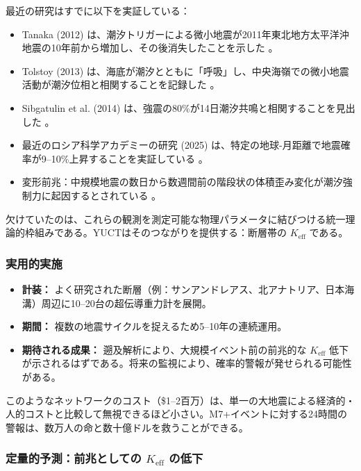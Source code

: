 \documentclass[12pt,a4paper]{article}
\theoremstyle{remark}
\begin{document}
	最近の研究はすでに以下を実証している：
	
	\begin{itemize}
		\item Tanaka (2012) は、潮汐トリガーによる微小地震が2011年東北地方太平洋沖地震の10年前から増加し、その後消失したことを示した \cite{Tanaka2012}。
		\item Tolstoy (2013) は、海底が潮汐とともに「呼吸」し、中央海嶺での微小地震活動が潮汐位相と相関することを記録した \cite{Tolstoy2013}。
		\item Sibgatulin et al. (2014) は、強震の80\%が14日潮汐共鳴と相関することを見出した \cite{Sibgatulin2014}。
		\item 最近のロシア科学アカデミーの研究 (2025) は、特定の地球-月距離で地震確率が9–10\%上昇することを実証している \cite{RAN2025}。
		\item 変形前兆：中規模地震の数日から数週間前の階段状の体積歪み変化が潮汐強制力に起因するとされている \cite{DeformationPrecursors2024}。
	\end{itemize}
	
	欠けていたのは、これらの観測を測定可能な物理パラメータに結びつける統一理論的枠組みである。YUCTはそのつながりを提供する：断層帯の \(K_{\mathrm{eff}}\) である。
	
	\subsubsection{実用的実施}
	
	\begin{itemize}
		\item \textbf{計装：} よく研究された断層（例：サンアンドレアス、北アナトリア、日本海溝）周辺に10–20台の超伝導重力計を展開。
		\item \textbf{期間：} 複数の地震サイクルを捉えるため5–10年の連続運用。
		\item \textbf{期待される成果：} 遡及解析により、大規模イベント前の前兆的な \(K_{\mathrm{eff}}\) 低下が示されるはずである。将来の監視により、確率的警報が発せられる可能性がある。
	\end{itemize}
	
	このようなネットワークのコスト（\$1–2百万）は、単一の大地震による経済的・人的コストと比較して無視できるほど小さい。M7+イベントに対する24時間の警報は、数万人の命と数十億ドルを救うことができる。
	
	\subsubsection{定量的予測：前兆としての \(K_{\mathrm{eff}}\) の低下}
	\label{subsubsec:precursor}
	
\end{document}
